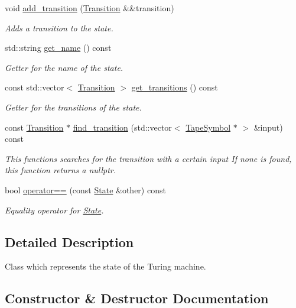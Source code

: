 \begin{DoxyCompactItemize}
void \hyperlink{classState_afa47bb95d7a504a74d0cd9f5deb6893b}{add\+\_\+transition} (\hyperlink{classTransition}{Transition} \&\&transition)
\begin{DoxyCompactList}\small\item\em Adds a transition to the state. \end{DoxyCompactList}\item 
std\+::string \hyperlink{classState_ab732c53a7478c2a24217283340e0c165}{get\+\_\+name} () const
\begin{DoxyCompactList}\small\item\em Getter for the name of the state. \end{DoxyCompactList}\item 
const std\+::vector$<$ \hyperlink{classTransition}{Transition} $>$ \hyperlink{classState_a652bb5b393761ec2d42445f96446c4a6}{get\+\_\+transitions} () const
\begin{DoxyCompactList}\small\item\em Getter for the transitions of the state. \end{DoxyCompactList}\item 
const \hyperlink{classTransition}{Transition} $\ast$ \hyperlink{classState_a807d7c8ed8b9c093d91900217dd302c1}{find\+\_\+transition} (std\+::vector$<$ \hyperlink{classTapeSymbol}{Tape\+Symbol} $\ast$ $>$ \&input) const
\begin{DoxyCompactList}\small\item\em This functions searches for the transition with a certain input If none is found, this function returns a nullptr. \end{DoxyCompactList}\item 
bool \hyperlink{classState_ab98d310aaceb21737346521c5bc6fc6c}{operator==} (const \hyperlink{classState}{State} \&other) const
\begin{DoxyCompactList}\small\item\em Equality operator for \hyperlink{classState}{State}. \end{DoxyCompactList}\end{DoxyCompactItemize}


\subsection{Detailed Description}
Class which represents the state of the Turing machine. 

\subsection{Constructor \& Destructor Documentation}
\mbox{\label{classState_acec8f151d743a370200a6468cdb6ed5e}} 

